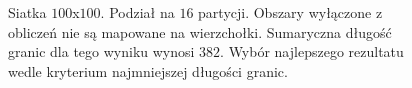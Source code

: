 \begin{figure}[h]
\begin{subfigure}{.33\textwidth}
    \caption[short]{}
\end{subfigure}
\caption{Siatka $100$x$100$. Podział na $16$ partycji.
Obszary wyłączone z obliczeń nie są mapowane na wierzchołki.
Sumaryczna długość granic dla tego wyniku wynosi $382$.
Wybór najlepszego rezultatu wedle kryterium najmniejszej długości granic.}
\label{result:m:1}
\end{figure}